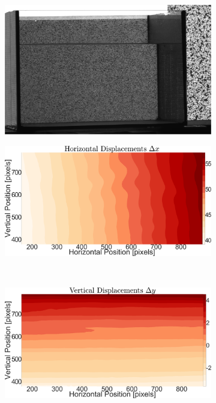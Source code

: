\documentclass{svjour3}                     %
\begin{document}
\begin{figure}[htbp]
\begin{subfigure}{.5\linewidth}
\centering \includegraphics[width = \textwidth]{TL_strat}
		\label{fig:strat0side}
\end{subfigure}%
\begin{subfigure}{.5\linewidth}
		\centering \includegraphics[width = \textwidth]{strat_DX}
		\label{fig:stratdx0side}
\end{subfigure} \\
\begin{subfigure}{.5\linewidth}
	\centering \includegraphics[width = \textwidth]{strat_DY}

\end{subfigure}
\end{figure}
\end{document}
